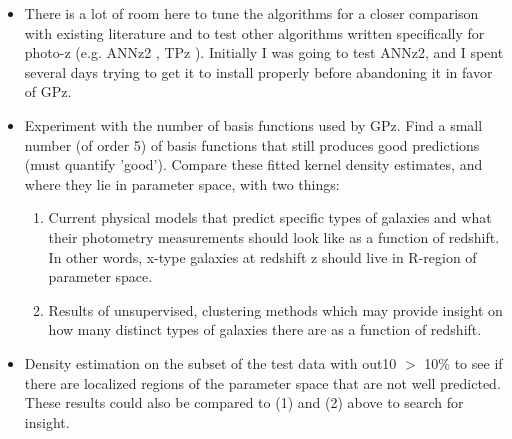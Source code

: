 \documentclass[13pt]{amsart}
\begin{document}
    \begin{itemize}
      \item There is a lot of room here to tune the algorithms for a closer comparison with existing literature and to test other algorithms written specifically for photo-z (e.g. ANNz2 \cite{annz2}, TPz \cite{tpz}). Initially I was going to test ANNz2, and I spent several days trying to get it to install properly before abandoning it in favor of GPz.


      \item Experiment with the number of basis functions used by GPz. Find a small number (of order 5) of basis functions that still produces good predictions (must quantify 'good'). Compare these fitted kernel density estimates, and where they lie in parameter space, with two things:
        \begin{enumerate}

          \item Current physical models that predict specific types of galaxies and what their photometry measurements should look like as a function of redshift. In other words, x-type galaxies at redshift z should live in R-region of parameter space.

          \item Results of unsupervised, clustering methods which may provide insight on how many distinct types of galaxies there are as a function of redshift.
        \end{enumerate}

      \item Density estimation on the subset of the test data with out10 $>$ 10\% to see if there are localized regions of the parameter space that are not well predicted. These results could also be compared to (1) and (2) above to search for insight.

    \end{itemize}




\end{document}
